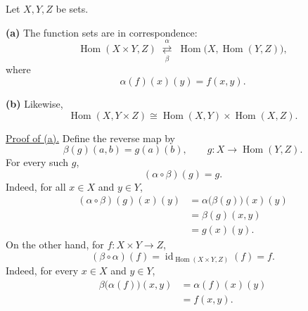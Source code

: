 \bigskip
\noindent{}\quad Let $X,Y,Z$ be sets.

\medskip
\noindent\textbf{(a)} The function sets are in correspondence:
\[
 \operatorname{Hom}(X\times Y,Z)
 \;\overset{\alpha}{\underset{\beta}{\rightleftarrows}}\;
 \operatorname{Hom}\bigl(X,\operatorname{Hom}(Y,Z)\bigr),
\]
where
\[
 \alpha(f)(x)(y)=f(x,y).
\]

\noindent\textbf{(b)} Likewise,
\[
 \operatorname{Hom}(X,Y\times Z)
 \cong\operatorname{Hom}(X,Y)\times\operatorname{Hom}(X,Z).
\]

\medskip
\noindent\underline{Proof of (a).}
Define the reverse map by
\[
 \beta(g)(a,b)=g(a)(b),\qquad
 g:X\longrightarrow\operatorname{Hom}(Y,Z).
\]
For every such $g$,
\[
 (\alpha\circ\beta)(g)=g.
\]
Indeed, for all $x\in X$ and $y\in Y$,
\[
 \begin{aligned}
 (\alpha\circ\beta)(g)(x)(y)
 &=\alpha\bigl(\beta(g)\bigr)(x)(y)\\
 &=\beta(g)(x,y)\\
 &=g(x)(y).
 \end{aligned}
\]
On the other hand, for $f:X\times Y\longrightarrow Z$,
\[
 (\beta\circ\alpha)(f)=\operatorname{id}_{\operatorname{Hom}(X\times Y,Z)}(f)=f.
\]
Indeed, for every $x\in X$ and $y\in Y$,
\[
 \begin{aligned}
 \beta\bigl(\alpha(f)\bigr)(x,y)
 &=\alpha(f)(x)(y)\\
 &=f(x,y).
 \end{aligned}
\]
